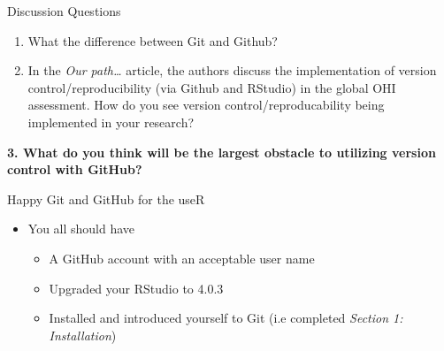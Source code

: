 \documentclass[
  ignorenonframetext,
]{beamer}
\providecommand{\tightlist}{%
  \setlength{\itemsep}{0pt}\setlength{\parskip}{0pt}}
\begin{document}
\begin{frame}{Discussion Questions}
\protect\hypertarget{discussion-questions-2}{}

\begin{enumerate}
\item
  What the difference between Git and Github?
\item
  In the \emph{Our path\ldots{}} article, the authors discuss the
  implementation of version control/reproducibility (via Github and
  RStudio) in the global OHI assessment. How do you see version
  control/reproducability being implemented in your research?
\end{enumerate}

\textbf{3. What do you think will be the largest obstacle to utilizing
version control with GitHub?}

\end{frame}

\begin{frame}{Happy Git and GitHub for the useR}
\protect\hypertarget{happy-git-and-github-for-the-user}{}

\begin{itemize}
\tightlist
\item
  You all should have

  \begin{itemize}
  \tightlist
  \item
    A GitHub account with an acceptable user name
  \item
    Upgraded your RStudio to 4.0.3
  \item
    Installed and introduced yourself to Git (i.e completed
    \emph{Section 1: Installation})
  \end{itemize}
\end{itemize}

\end{frame}
\end{document}
